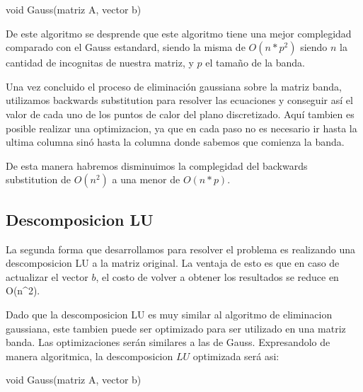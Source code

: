 \begin{algorithm}
\begin{algorithmic}[1]\parskip=1mm
\caption{void Gauss(matriz A, vector b)}
\end{algorithmic}
\end{algorithm}

De este algoritmo se desprende que este algoritmo tiene una mejor complegidad comparado con el Gauss estandard, siendo la misma de $O(n*p^2)$ siendo $n$ la cantidad de incognitas de nuestra matriz, y $p$ el tamaño de la banda.

Una vez concluido el proceso de eliminaci\'on gaussiana sobre la matriz banda, utilizamos backwards substitution para resolver las ecuaciones y conseguir as\'i el valor de cada uno de los puntos de calor del plano discretizado. Aqu\'i tambien es posible realizar una optimizacion, ya que en cada paso no es necesario ir hasta la ultima columna sin\'o hasta la columna donde sabemos que comienza la banda.

De esta manera habremos disminuimos la complegidad del backwards substitution de $O(n^2)$ a una menor de $O(n*p)$.

\subsection{Descomposicion LU}

La segunda forma que desarrollamos para resolver el problema es realizando una descomposicion LU a la matriz original. La ventaja de esto es que en caso de actualizar el vector $b$, el costo de volver a obtener los resultados se reduce en O(n^2).

Dado que la descomposicion LU es muy similar al algoritmo de eliminacion gaussiana, este tambien puede ser optimizado para ser utilizado en una matriz banda. Las optimizaciones ser\'an similares a las de Gauss. Expresandolo de manera algoritmica, la descomposicion $LU$ optimizada ser\'a asi:

\begin{algorithm}
\begin{algorithmic}[1]\parskip=1mm
\caption{void Gauss(matriz A, vector b)}
\end{algorithmic}
\end{algorithm}

